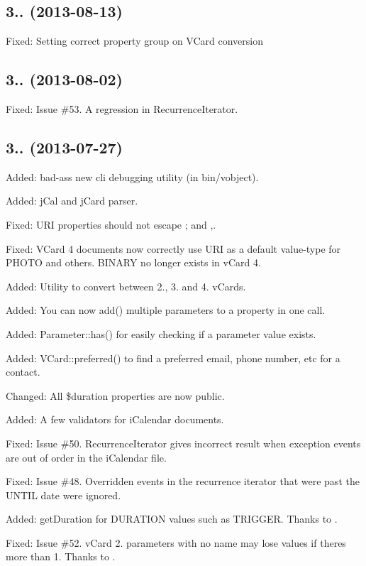 \subsection*{3.. (2013-\/08-\/13) }


\begin{DoxyItemize}
\item Fixed\+: Setting correct property group on V\+Card conversion
\end{DoxyItemize}

\subsection*{3.. (2013-\/08-\/02) }


\begin{DoxyItemize}
\item Fixed\+: Issue \#53. A regression in Recurrence\+Iterator.
\end{DoxyItemize}

\subsection*{3.. (2013-\/07-\/27) }


\begin{DoxyItemize}
\item Added\+: bad-\/ass new cli debugging utility (in bin/vobject).
\item Added\+: j\+Cal and j\+Card parser.
\item Fixed\+: U\+RI properties should not escape ; and ,.
\item Fixed\+: V\+Card 4 documents now correctly use U\+RI as a default value-\/type for P\+H\+O\+TO and others. B\+I\+N\+A\+RY no longer exists in v\+Card 4.
\item Added\+: Utility to convert between 2., 3. and 4. v\+Cards.
\item Added\+: You can now add() multiple parameters to a property in one call.
\item Added\+: Parameter\+::has() for easily checking if a parameter value exists.
\item Added\+: V\+Card\+::preferred() to find a preferred email, phone number, etc for a contact.
\item Changed\+: All \$duration properties are now public.
\item Added\+: A few validators for i\+Calendar documents.
\item Fixed\+: Issue \#50. Recurrence\+Iterator gives incorrect result when exception events are out of order in the i\+Calendar file.
\item Fixed\+: Issue \#48. Overridden events in the recurrence iterator that were past the U\+N\+T\+IL date were ignored.
\item Added\+: get\+Duration for D\+U\+R\+A\+T\+I\+ON values such as T\+R\+I\+G\+G\+ER. Thanks to .
\item Fixed\+: Issue \#52. v\+Card 2. parameters with no name may lose values if there\textquotesingle{}s more than 1. Thanks to .
\end{DoxyItemize}

